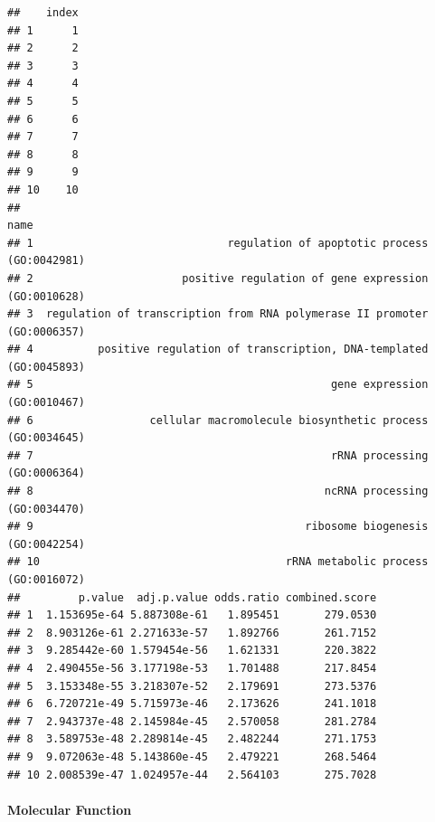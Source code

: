 \documentclass[
]{article}
\begin{document}
\begin{verbatim}
##    index
## 1      1
## 2      2
## 3      3
## 4      4
## 5      5
## 6      6
## 7      7
## 8      8
## 9      9
## 10    10
##                                                                        name
## 1                              regulation of apoptotic process (GO:0042981)
## 2                       positive regulation of gene expression (GO:0010628)
## 3  regulation of transcription from RNA polymerase II promoter (GO:0006357)
## 4          positive regulation of transcription, DNA-templated (GO:0045893)
## 5                                              gene expression (GO:0010467)
## 6                  cellular macromolecule biosynthetic process (GO:0034645)
## 7                                              rRNA processing (GO:0006364)
## 8                                             ncRNA processing (GO:0034470)
## 9                                          ribosome biogenesis (GO:0042254)
## 10                                      rRNA metabolic process (GO:0016072)
##         p.value  adj.p.value odds.ratio combined.score
## 1  1.153695e-64 5.887308e-61   1.895451       279.0530
## 2  8.903126e-61 2.271633e-57   1.892766       261.7152
## 3  9.285442e-60 1.579454e-56   1.621331       220.3822
## 4  2.490455e-56 3.177198e-53   1.701488       217.8454
## 5  3.153348e-55 3.218307e-52   2.179691       273.5376
## 6  6.720721e-49 5.715973e-46   2.173626       241.1018
## 7  2.943737e-48 2.145984e-45   2.570058       281.2784
## 8  3.589753e-48 2.289814e-45   2.482244       271.1753
## 9  9.072063e-48 5.143860e-45   2.479221       268.5464
## 10 2.008539e-47 1.024957e-44   2.564103       275.7028
\end{verbatim}

\hypertarget{molecular-function}{%
\paragraph{Molecular Function}\label{molecular-function}}
\end{document}
